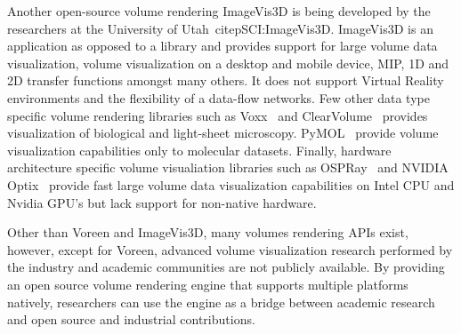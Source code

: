 Another open-source volume rendering ImageVis3D is being developed by the
researchers at the University of Utah~citep{SCI:ImageVis3D}. ImageVis3D is an
application as opposed to a library and provides support for large volume data
visualization, volume visualization on a desktop and mobile device, MIP, 1D and
2D transfer functions amongst many others.  It does not support Virtual Reality
environments and the flexibility of a data-flow networks.  Few other data type
specific volume rendering libraries such as Voxx~\citep{clendenon_voxx:_2002}
and ClearVolume~\cite{royer_clearvolume:_2015} provides visualization of
biological and light-sheet microscopy. PyMOL~\cite{schrodinger_llc_pymol_2015}
provide volume visualization capabilities only to molecular datasets. Finally,
hardware architecture specific volume visualiation libraries such as
OSPRay~\cite{wald_ospray_2017} and NVIDIA\textsuperscript{\textregistered}
Optix\textsuperscript{\texttrademark}~\citep{parker_optix:_2010} provide fast
large volume data visualization capabilities on Intel CPU and Nvidia GPU's but
lack support for non-native hardware.

Other than Voreen and ImageVis3D, many volumes rendering APIs exist, however,
except for Voreen, advanced volume visualization research performed by the
industry and academic communities are not publicly available. By providing an
open source volume rendering engine that supports multiple platforms natively,
researchers can use the engine as a bridge between academic research and open
source and industrial contributions.
